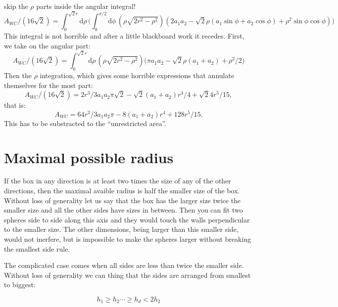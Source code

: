 \documentclass[superscriptaddress,pre,reprint,showpacs,onecolumn]{revtex4-1}
\newcommand{\rd}[1]{\mathrm{d}{#1} \,}
\begin{document}
  skip the $\rho$ parts inside the angular integral!
  \begin{equation}
    A_{WC}/(16\sqrt{2})=\int_0^{\sqrt{2}r} 
    \rd \rho \Bigg(
    \int_0^{\pi/2} \rd \phi
    (\rho \sqrt{2 r^2 - \rho^2})
    (2 a_1 a_2 -\sqrt{2} \rho (a_1 \sin \phi+ a_2 \cos\phi)
    +\rho^2 \sin\phi \cos\phi) \Bigg)
  \end{equation}
  This integral is not horrible and after a little blackboard work it recedes.
  First, we take on the angular part:
  \begin{equation}
    A_{WC}/(16\sqrt{2})=\int_0^{\sqrt{2}r}
    \rd \rho
    (\rho \sqrt{2 r^2 - \rho^2})
    \big(
    \pi a_1a_2-\sqrt{2}\rho(a_1+a_2)+\rho^2/2
    \big)
  \end{equation}
  Then the $\rho$ integration, which gives some horrible
  expressions that annulate themselves for the most part:
  \begin{equation}
    A_{WC}/(16\sqrt{2})=
    2 r^3/3  a_1 a_2 \pi \sqrt{2}
    -\sqrt{2}(a_1+a_2)r^4/4
    +\sqrt{2}4 r^5/15,
  \end{equation}
  that is:
  \begin{equation}
    A_{WC}=
    64 r^3/3  a_1 a_2 \pi 
    -8(a_1+a_2)r^4
    +128 r^5/15.
  \end{equation}
  This has to be substracted to the ``unrestricted area''.


\section{Maximal possible radius}

If the box in any direction is at least two times the size of any of
the other directions, then the maximal avaible radius is half the smaller
size of the box. Without loss of generality let us say that the box has
the larger size twice the smaller size and all the other sides have
sizes in between. Then you can fit two spheres side to side along this
axis and they would touch the walls perpendicular to the smaller size.
The other dimensions, being larger than this smaller side, would not
inerfere, but is impossible to make the spheres larger without
breaking the smallest side rule.

The complicated case comes when all sides are less than twice
the smaller side. Without loss of generality we can thing that the sides
are arranged from smallest to biggest:

\begin{equation}\label{ordens}
  h_1 \geq h_2 \cdots \geq h_d < 2 h_2
\end{equation}
\end{document}
